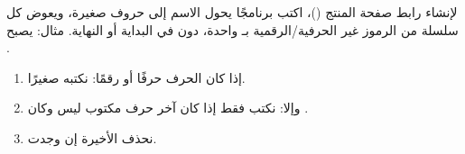 \begin{statement}
لإنشاء رابط صفحة المنتج ()، اكتب برنامجًا يحول الاسم إلى حروف صغيرة، ويعوض كل سلسلة من الرموز غير الحرفية/الرقمية بـ \code{-} واحدة، دون \code{-} في البداية أو النهاية. مثال:  يصبح .
\end{statement}
\begin{stepsbox}\begin{enumerate}
\item إذا كان الحرف حرفًا أو رقمًا: نكتبه صغيرًا.
\item وإلا: نكتب \code{-} فقط إذا كان آخر حرف مكتوب ليس \code{-} وكان .
\item نحذف \code{-} الأخيرة إن وجدت.
\end{enumerate}\end{stepsbox}
